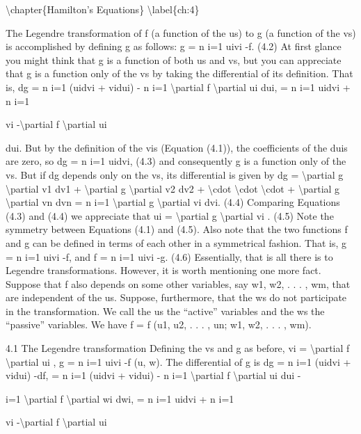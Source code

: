 \textbackslash{}chapter\{Hamilton's Equations\}
\textbackslash{}label\{ch:4\}

The Legendre transformation of f (a function of the us) to g (a function of
the vs) is accomplished by defining g as follows:
g =
n
i=1
uivi -f.
(4.2)
At first glance you might think that g is a function of both us and vs, but you
can appreciate that g is a function only of the vs by taking the differential of
its definition. That is,
dg =
n
i=1
(uidvi + vidui) -
n
i=1
\textbackslash{}partial f
\textbackslash{}partial ui
dui,
=
n
i=1
uidvi +
n
i=1

vi -\textbackslash{}partial f
\textbackslash{}partial ui

dui.
But by the definition of the vis (Equation (4.1)), the coefficients of the duis are
zero, so
dg =
n
i=1
uidvi,
(4.3)
and consequently g is a function only of the vs. But if dg depends only on the
vs, its differential is given by
dg = \textbackslash{}partial g
\textbackslash{}partial v1
dv1 + \textbackslash{}partial g
\textbackslash{}partial v2
dv2 + \textbackslash{}cdot  \textbackslash{}cdot  \textbackslash{}cdot  + \textbackslash{}partial g
\textbackslash{}partial vn
dvn =
n
i=1
\textbackslash{}partial g
\textbackslash{}partial vi
dvi.
(4.4)
Comparing Equations (4.3) and (4.4) we appreciate that
ui = \textbackslash{}partial g
\textbackslash{}partial vi
.
(4.5)
Note the symmetry between Equations (4.1) and (4.5). Also note that the two
functions f and g can be defined in terms of each other in a symmetrical
fashion. That is,
g =
n
i=1
uivi -f,
and
f =
n
i=1
uivi -g.
(4.6)
Essentially, that is all there is to Legendre transformations. However, it is
worth mentioning one more fact. Suppose that f also depends on some other
variables, say w1, w2, . . . , wm, that are independent of the us. Suppose, furthermore, that the ws do not participate in the transformation. We call the us
the ``active'' variables and the ws the ``passive'' variables. We have
f = f (u1, u2, . . . , un; w1, w2, . . . , wm).

4.1
The Legendre transformation
Defining the vs and g as before,
vi = \textbackslash{}partial f
\textbackslash{}partial ui
,
g =
n
i=1
uivi -f (u, w).
The differential of g is
dg =
n
i=1
(uidvi + vidui) -df,
=
n
i=1
(uidvi + vidui) -
n
i=1
\textbackslash{}partial f
\textbackslash{}partial ui
dui -

i=1
\textbackslash{}partial f
\textbackslash{}partial wi
dwi,
=
n
i=1
uidvi +
n
i=1

vi -\textbackslash{}partial f
\textbackslash{}partial ui


